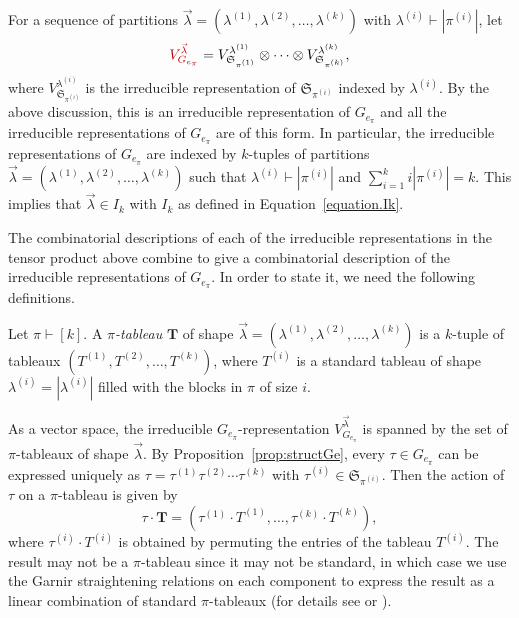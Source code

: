 \documentclass[ALCO,Unicode]{cedram}
\newcommand{\defncolor}{\color{darkred}}
\newcommand{\defn}[1]{{\defncolor\emph{#1}}} %
\begin{document}
For a sequence of partitions
$\vec{\lambda} = (\lambda^{(1)}, \lambda^{(2)}, \ldots, \lambda^{(k)})$
with $\lambda^{(i)} \vdash |\pi^{(i)}|$,
let
\begin{equation*}
    {\defncolor V_{G_{e_\pi}}^{\vec{\lambda}}} =
    V_{\mathfrak{S}_{\pi^{(1)}}}^{\lambda^{(1)}}
    \otimes \cdots \otimes
    V_{\mathfrak{S}_{\pi^{(k)}}}^{\lambda^{(k)}},
\end{equation*}
where $V_{\mathfrak{S}_{\pi^{(i)}}}^{\lambda^{(i)}}$ is the irreducible
representation of $\mathfrak{S}_{\pi^{(i)}}$ indexed by $\lambda^{(i)}$.
By the above discussion, this is an irreducible representation of $G_{e_\pi}$
and all the irreducible representations of $G_{e_\pi}$ are of this form.
In particular, the irreducible representations of $G_{e_\pi}$ are indexed by
$k$-tuples of partitions
$\vec{\lambda} = (\lambda^{(1)}, \lambda^{(2)}, \ldots, \lambda^{(k)})$ such that
$\lambda^{(i)} \vdash |\pi^{(i)}|$ and $\sum_{i=1}^k i |\pi^{(i)}| = k$.
This implies that $\vec{\lambda}\in I_k$ with $I_k$ as defined in Equation~\eqref{equation.Ik}.

The combinatorial descriptions of each of the irreducible representations in
the tensor product above combine to give a combinatorial description of the
irreducible representations of $G_{e_\pi}$. In order to state it, we need the
following definitions.

\begin{definition}
Let $\pi \vdash [k]$.
A \defn{$\pi$-tableau} $\mathbf{T}$ of shape
$\vec{\lambda} = (\lambda^{(1)}, \lambda^{(2)}, \ldots, \lambda^{(k)})$
is a
$k$-tuple of tableaux $(T^{(1)}, T^{(2)}, \ldots, T^{(k)})$,
where  $T^{(i)}$ is a standard tableau of shape $\lambda^{(i)} = |\lambda^{(i)}|$
filled with the blocks in $\pi$ of size $i$.
\end{definition}

As a vector space, the irreducible $G_{e_\pi}$-representation
$V^{\vec{\lambda}}_{G_{e_\pi}}$ is spanned by the set of $\pi$-tableaux
of shape $\vec{\lambda}$.
By Proposition~\ref{prop:structGe},
every $\tau\in G_{e_\pi}$ can be expressed uniquely as $\tau = \tau^{(1)}
\tau^{(2)} \cdots  \tau^{(k)}$ with $\tau^{(i)} \in \mathfrak{S}_{\pi^{(i)}}$.
Then the action of $\tau$ on a $\pi$-tableau is given by
\begin{equation*}
    \tau \cdot \mathbf{T} = ( \tau^{(1)}\cdot T^{(1)}, \ldots, \tau^{(k)}\cdot T^{(k)}),
\end{equation*}
where $\tau^{(i)} \cdot T^{(i)}$ is obtained by permuting the entries of the tableau $T^{(i)}$.
The result may not be a $\pi$-tableau since it may not be standard,
in which case we use the Garnir straightening relations on each component
to express the result as a linear combination of standard $\pi$-tableaux
(for details see \cite[Section 2.6]{Sagan.2001} or \cite{CarreLascouxLeclerc}).
\end{document}
